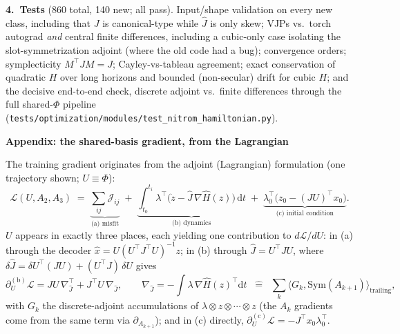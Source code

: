 \documentclass[10pt]{article}
\newcommand{\code}[1]{\colorbox{codegray}{\small\texttt{#1}}}
\newcommand{\Jhat}{\hat{J}}
\newcommand{\Hhat}{\hat{H}}
\begin{document}
\textbf{4.\ Tests}\;
(860 total, 140 new; all pass).\; Input/shape validation on every new class,
including that $J$ is canonical-type while $\Jhat$ is only skew;
VJPs vs.\ torch autograd \emph{and} central finite differences, including a
cubic-only case isolating the slot-symmetrization adjoint (where the old code
had a bug); convergence orders; symplecticity $M^\top J M = J$;
Cayley-vs-tableau agreement; exact conservation of quadratic $H$ over long
horizons and bounded (non-secular) drift for cubic $H$; and the decisive
end-to-end check, discrete adjoint vs.\ finite differences through the full
shared-$\Phi$ pipeline (\code{tests/optimization/modules/test\_nitrom\_hamiltonian.py}).


\newpage

\begin{center}
    {\Large\bfseries Appendix: the shared-basis gradient, from the Lagrangian}
\end{center}

The training gradient originates from the adjoint (Lagrangian) formulation
(one trajectory shown; $U \equiv \Phi$):
\begin{equation*}
    \mathcal{L}(U, A_2, A_3)
    \;=\;
    \underbrace{\textstyle\sum_{ij}\mathcal{J}_{ij}}_{\text{(a) misfit}}
    \;+\;
    \underbrace{\int_{t_0}^{t_i} \lambda^\top\bigl(\dot z
        - \Jhat\,\nabla\Hhat(z)\bigr)\,\mathrm{d}t}_{\text{(b) dynamics}}
    \;+\;
    \underbrace{\lambda_0^\top\bigl(z_0 - (JU)^\top x_0\bigr)}_{\text{(c) initial condition}} .
\end{equation*}
$U$ appears in exactly three places, each yielding one contribution to
$d\mathcal{L}/dU$: in (a) through the decoder
$\hat x = U (U^\top J^\top U)^{-1} z$; in (b) through
$\Jhat = U^\top J U$, where
$\delta\Jhat = \delta U^\top (JU) + (U^\top J)\,\delta U$ gives
\begin{equation*}
    \partial_U^{(\mathrm b)}\mathcal{L}
    = J U\, \nabla_{\Jhat}^{\top} + J^\top U\, \nabla_{\Jhat},
    \qquad
    \nabla_{\Jhat} = -\!\int \lambda\, \nabla\Hhat(z)^\top \mathrm{d}t
    \;\;\widehat{=}\;\; \sum_k \bigl\langle G_k, \mathrm{Sym}(A_{k+1})
    \bigr\rangle_{\text{trailing}},
\end{equation*}
with $G_k$ the discrete-adjoint accumulations of
$\lambda \otimes z \otimes \cdots \otimes z$ (the $A_k$ gradients come from
the same term via $\partial_{A_{k+1}}$); and in (c) directly,
$\partial_U^{(\mathrm c)}\mathcal{L} = -J^\top x_0 \lambda_0^\top$.
\end{document}
